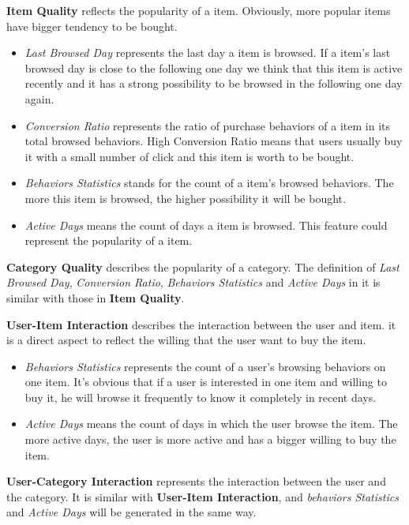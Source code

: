 \documentclass{llncs}
\begin{document}
\textbf{Item Quality} reflects the popularity of a item.
Obviously, more popular items have bigger tendency to be bought.
\begin{itemize}
	\item \emph{Last Browsed Day} represents the last day a item is browsed.
	If a item's last browsed day is close to the following one day
	we think that this item is active recently
	and it has a strong possibility to be browsed in the following one day again.
	
	\item \emph{Conversion Ratio} represents the ratio of purchase behaviors of a item
	in its total browsed behaviors. High Conversion Ratio means that users usually buy it
	with a small number of click and this item is worth to be bought.
	
	\item \emph{Behaviors Statistics} stands for the count of a item's browsed behaviors.
	The more this item is browsed, the higher possibility it will be bought.
	
	\item \emph{Active Days} means the count of days a item is browsed.
	This feature could represent the popularity of a item.
\end{itemize}

\textbf{Category Quality} describes the popularity of a category.
The definition of \emph{Last Browsed Day}, \emph{Conversion Ratio},
\emph{Behaviors Statistics} and \emph{Active Days} in it is similar
with those in \textbf{Item Quality}.

\textbf{User-Item Interaction} describes the interaction between the user and item.
it is a direct aspect to reflect the willing that the user want to buy the item.
\begin{itemize}
	\item \emph{Behaviors Statistics} represents the count of a user's browsing behaviors on one item.
	It's obvious that if a user is interested in one item and willing to buy it,
	he will browse it frequently to know it completely in recent days.
	
	\item \emph{Active Days} means the count of days in which the user browse the item.
	The more active days, the user is more active and has a bigger willing to buy the item.
\end{itemize}

\textbf{User-Category Interaction} represents the interaction between the user and the category.
It is similar with \textbf{User-Item Interaction},
and \emph{behaviors Statistics} and \emph{Active Days} will be generated in the same way.
\end{document}

